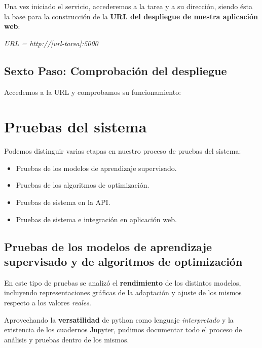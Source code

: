 Una vez iniciado el servicio, accederemos a la tarea y a su dirección, siendo ésta la base para la construcción de la \textbf{URL del despliegue de nuestra aplicación web}:

\textit{URL = http://[url-tarea]:5000}


\subsection{Sexto Paso: Comprobación del despliegue}

Accedemos a la URL y comprobamos su funcionamiento:


\section{Pruebas del sistema}

Podemos distinguir varias etapas en nuestro proceso de pruebas del sistema: 

\begin{itemize}
    \item Pruebas de los modelos de aprendizaje supervisado.
    \item Pruebas de los algoritmos de optimización.
    \item Pruebas de sistema en la API.
    \item Pruebas de sistema e integración en aplicación web.
\end{itemize}

\subsection{Pruebas de los modelos de aprendizaje supervisado y de algoritmos de optimización}

En este tipo de pruebas se analizó el \textbf{rendimiento} de los distintos modelos, incluyendo representaciones gráficas de la adaptación y ajuste de los mismos respecto a los valores \textit{reales}.

Aprovechando la \textbf{versatilidad} de python como lenguaje \textit{interpretado} y la existencia de los cuadernos Jupyter, pudimos documentar todo el proceso de análisis y pruebas dentro de los mismos.


